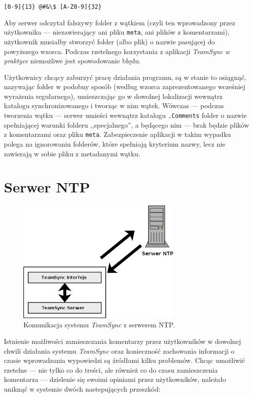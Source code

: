 \begin{center}
  \texttt{[0-9]\{13\} @\#\&\textbackslash\$ [A-Z0-9]\{32\}}
\end{center}

Aby serwer odczytał fałszywy folder z wątkiem (czyli ten wprowadzony przez użytkownika --- niezawierający ani pliku \texttt{meta}, ani plików z komentarzami), użytkownik musiałby stworzyć folder (albo plik) o nazwie pasującej do powyższego wzorca. Podczas rzetelnego korzystania z aplikacji \emph{TeamSync} \emph{w praktyce} niemożliwe jest spowodowanie błędu.

Użytkownicy chcący zaburzyć pracę działania programu, są w stanie to osiągnąć, nazywając folder w podobny sposób (według wzorca zaprezentowanego wcześniej wyrażenia regularnego), umieszczając go w dowolnej lokalizacji wewnątrz katalogu synchronizowanego i tworząc w nim wątek. Wówczas --- podczas tworzenia wątku --- serwer umieści wewnątrz katalogu \texttt{.Comments} folder o nazwie spełniającej warunki folderu ,,specjalnego'', a będącego nim --- brak będzie plików z komentarzami oraz pliku \texttt{meta}. Zabezpieczenie aplikacji w takim wypadku polega na ignorowaniu folderów, które spełniają kryterium nazwy, lecz nie zawierają w sobie pliku z metadanymi wątku.

\section{Serwer NTP}

\begin{figure}[htb]
  \vspace{5pt}
  \begin{center}
    \includegraphics[width=230pt]{figures/architecturentp.png}
  \end{center}
  \caption{Komunikacja systemu \emph{TeamSync} z serwerem NTP.}
\end{figure}

Istnienie możliwości zamieszczania komentarzy przez użytkowników w dowolnej chwili działania systemu \emph{TeamSync} oraz konieczność zachowania informacji o czasie wprowadzania wypowiedzi są źródłami kilku problemów. Chcąc umożliwić rzetelne --- nie tylko co do treści, ale również co do czasu zamieszczenia komentarza --- dzielenie się swoimi opiniami przez użytkowników, należało uniknąć w systemie dwóch nastepujących przeszkód:

